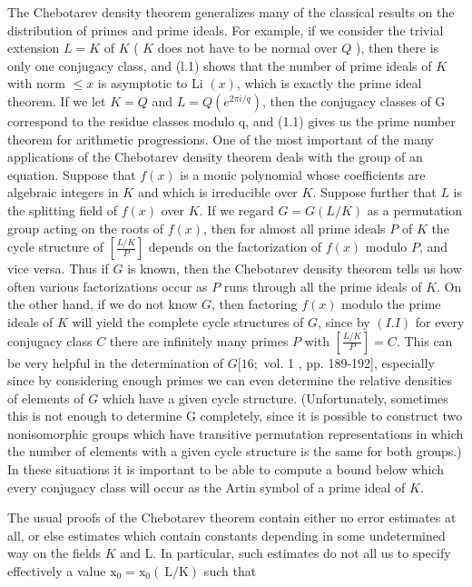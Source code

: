 The Chebotarev density theorem generalizes many of the classical results on the distribution of primes and prime ideals. For example, if we consider the trivial extension $L=K$ of $K$ ( $K$ does not have to be normal over $Q$ ), then there is only one conjugacy class, and (l.1) shows that the number of prime ideals of $K$ with norm $\leqslant x$ is asymptotic to Li $(x)$, which is exactly the prime ideal theorem. If we let $K=Q$ and $L=Q\left(e^{2 \pi i / q}\right)$, then the conjugacy classes of G correspond to the residue classes modulo q, and (1.1) gives us the prime number theorem for arithmetic progressions. One of the most important of the many applications of the Chebotarev density theorem deals with the group of an equation. Suppose that $f(x)$ is a monic polynomial whose coefficients are algebraic integers in $K$ and which is irreducible over $K$. Suppose further that $L$ is the splitting field of $f(x)$ over $K$. If we regard $G=G(L / K)$ as a permutation group acting on the roots of $f(x)$, then for almost all prime ideals $P$ of $K$ the cycle structure of $\left[\frac{L / K}{P}\right]$ depends on the factorization of $f(x)$ modulo $P$, and vice versa. Thus if $G$ is known, then the Chebotarev density theorem tells us how often various factorizations occur as $P$ runs through all the prime ideals of $K$. On the other hand, if we do not know $G$, then factoring $f(x)$ modulo the prime ideals of $K$ will yield the complete cycle structures of $G$, since by $(I . I)$ for every conjugacy class $C$ there are infinitely many primes $P$ with $\left[\frac{L / K}{P}\right]=C$. This can be very helpful in the determination of $G[16 ;$ vol. 1 , pp. 189-192], especially since by considering enough primes we can even determine the relative densities of elements of $G$ which have a given cycle structure. (Unfortunately, sometimes this is not enough to determine G completely, since it is possible to construct two nonisomorphic groups which have transitive permutation representations in which the number of elements with a given cycle structure is the same for both groups.) In these situations it is important to be able to compute a bound below which every conjugacy class will occur as the Artin symbol of a prime ideal of $K$.

The usual proofs of the Chebotarev theorem contain either no error estimates at all, or else estimates which contain constants depending in some undetermined way on the fields $K$ and L. In particular, such estimates do not all us to specify effectively a value $\mathrm{x}_{0}=\mathrm{x}_{0}(\mathrm{~L} / \mathrm{K})$ such that

